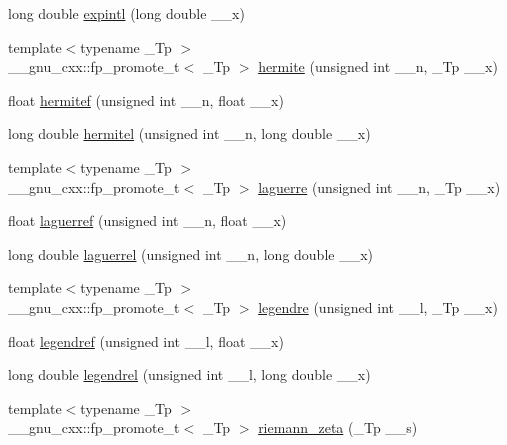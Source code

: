 \begin{DoxyCompactItemize}
\item 
long double \hyperlink{group__cxx17__math__spec__func_ga1329130b32328d0666e290ee5931fa4f}{expintl} (long double \+\_\+\+\_\+x)
\item 
{\footnotesize template$<$typename \+\_\+\+Tp $>$ }\\\+\_\+\+\_\+gnu\+\_\+cxx\+::fp\+\_\+promote\+\_\+t$<$ \+\_\+\+Tp $>$ \hyperlink{group__cxx17__math__spec__func_ga8bd1626f1e3f7256c4fd13579f881183}{hermite} (unsigned int \+\_\+\+\_\+n, \+\_\+\+Tp \+\_\+\+\_\+x)
\item 
float \hyperlink{group__cxx17__math__spec__func_ga94dae7444bb349e33057a92932db8abe}{hermitef} (unsigned int \+\_\+\+\_\+n, float \+\_\+\+\_\+x)
\item 
long double \hyperlink{group__cxx17__math__spec__func_ga21f8e312ee3e65286f86bf141b0f32e0}{hermitel} (unsigned int \+\_\+\+\_\+n, long double \+\_\+\+\_\+x)
\item 
{\footnotesize template$<$typename \+\_\+\+Tp $>$ }\\\+\_\+\+\_\+gnu\+\_\+cxx\+::fp\+\_\+promote\+\_\+t$<$ \+\_\+\+Tp $>$ \hyperlink{group__cxx17__math__spec__func_ga9d7b24a11dad27690387405548973ef9}{laguerre} (unsigned int \+\_\+\+\_\+n, \+\_\+\+Tp \+\_\+\+\_\+x)
\item 
float \hyperlink{group__cxx17__math__spec__func_gada763419b0e21b38e38daa8b6eb56a8c}{laguerref} (unsigned int \+\_\+\+\_\+n, float \+\_\+\+\_\+x)
\item 
long double \hyperlink{group__cxx17__math__spec__func_gaaf8b141edf9163b37ea4f2ed3e0191fc}{laguerrel} (unsigned int \+\_\+\+\_\+n, long double \+\_\+\+\_\+x)
\item 
{\footnotesize template$<$typename \+\_\+\+Tp $>$ }\\\+\_\+\+\_\+gnu\+\_\+cxx\+::fp\+\_\+promote\+\_\+t$<$ \+\_\+\+Tp $>$ \hyperlink{group__cxx17__math__spec__func_gad06811f4e139b0ba84235c1f0d34d86e}{legendre} (unsigned int \+\_\+\+\_\+l, \+\_\+\+Tp \+\_\+\+\_\+x)
\item 
float \hyperlink{group__cxx17__math__spec__func_gaed94e3c664c99f5204da75be75aeac21}{legendref} (unsigned int \+\_\+\+\_\+l, float \+\_\+\+\_\+x)
\item 
long double \hyperlink{group__cxx17__math__spec__func_ga1b39bc22e3cc4860d08eb54099460391}{legendrel} (unsigned int \+\_\+\+\_\+l, long double \+\_\+\+\_\+x)
\item 
{\footnotesize template$<$typename \+\_\+\+Tp $>$ }\\\+\_\+\+\_\+gnu\+\_\+cxx\+::fp\+\_\+promote\+\_\+t$<$ \+\_\+\+Tp $>$ \hyperlink{group__cxx17__math__spec__func_gac4ef9d52ee583c77937c3a420b7c72ca}{riemann\+\_\+zeta} (\+\_\+\+Tp \+\_\+\+\_\+s)

\end{DoxyCompactItemize}
